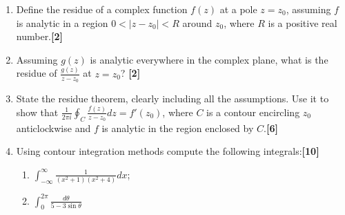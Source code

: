 \documentclass[a4paper]{article}
\begin{document}
\begin{qns}\leavevmode
\begin{enumerate}[label=(\alph*)]
\item Define the residue of a complex function $f(z)$ at a pole $z = z_0$, assuming $f$ is analytic in a region $0 < |z − z_0| < R$ around $z_0$, where $R$ is a positive real number.\hfill\textbf{[2]}
\item Assuming $g(z)$ is analytic everywhere in the complex plane, what is the residue of $\frac{g(z)}{z-z_0}$ at $z = z_0$? \hfill\textbf{[2]}
\item State the residue theorem, clearly including all the assumptions. Use it to show that $\frac{1}{2\pi i}\oint_C\frac{f(z)}{z-z_0}dz=f'(z_0)$, where $C$ is a contour encircling $z_0$ anticlockwise and $f$ is analytic in the region enclosed by $C$.\hfill\textbf{[6]}
\item Using contour integration methods compute the following integrals:\hfill\textbf{[10]}
\begin{enumerate}[label=(\roman*)]
    \item $\int_{-\infty}^\infty\frac{1}{(x^2+1)(x^2+4)}dx$;
    \item $\int_0^{2\pi}\frac{d\theta}{5-3\sin\theta}$
\end{enumerate}
\end{enumerate}
\end{qns}
\end{document}
